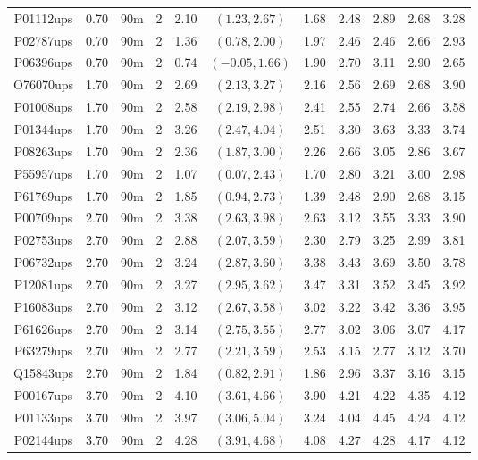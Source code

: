 \begin{landscape}
\begin{longtable}{cccc|cc|ccccc}
  P01112ups & 0.70 & 90m &   2 & 2.10 & $(1.23, 2.67)$ & 1.68 & 2.48 & 2.89 & 2.68 & 3.28 \\ 
  P02787ups & 0.70 & 90m &   2 & 1.36 & $(0.78, 2.00)$ & 1.97 & 2.46 & 2.46 & 2.66 & 2.93 \\ 
  P06396ups & 0.70 & 90m &   2 & 0.74 & $(-0.05, 1.66)$ & 1.90 & 2.70 & 3.11 & 2.90 & 2.65 \\ 
  O76070ups & 1.70 & 90m &   2 & 2.69 & $(2.13, 3.27)$ & 2.16 & 2.56 & 2.69 & 2.68 & 3.90 \\ 
  P01008ups & 1.70 & 90m &   2 & 2.58 & $(2.19, 2.98)$ & 2.41 & 2.55 & 2.74 & 2.66 & 3.58 \\ 
  P01344ups & 1.70 & 90m &   2 & 3.26 & $(2.47, 4.04)$ & 2.51 & 3.30 & 3.63 & 3.33 & 3.74 \\ 
  P08263ups & 1.70 & 90m &   2 & 2.36 & $(1.87, 3.00)$ & 2.26 & 2.66 & 3.05 & 2.86 & 3.67 \\ 
  P55957ups & 1.70 & 90m &   2 & 1.07 & $(0.07, 2.43)$ & 1.70 & 2.80 & 3.21 & 3.00 & 2.98 \\ 
  P61769ups & 1.70 & 90m &   2 & 1.85 & $(0.94, 2.73)$ & 1.39 & 2.48 & 2.90 & 2.68 & 3.15 \\ 
  P00709ups & 2.70 & 90m &   2 & 3.38 & $(2.63, 3.98)$ & 2.63 & 3.12 & 3.55 & 3.33 & 3.90 \\ 
  P02753ups & 2.70 & 90m &   2 & 2.88 & $(2.07, 3.59)$ & 2.30 & 2.79 & 3.25 & 2.99 & 3.81 \\ 
  P06732ups & 2.70 & 90m &   2 & 3.24 & $(2.87, 3.60)$ & 3.38 & 3.43 & 3.69 & 3.50 & 3.78 \\ 
  P12081ups & 2.70 & 90m &   2 & 3.27 & $(2.95, 3.62)$ & 3.47 & 3.31 & 3.52 & 3.45 & 3.92 \\ 
  P16083ups & 2.70 & 90m &   2 & 3.12 & $(2.67, 3.58)$ & 3.02 & 3.22 & 3.42 & 3.36 & 3.95 \\ 
  P61626ups & 2.70 & 90m &   2 & 3.14 & $(2.75, 3.55)$ & 2.77 & 3.02 & 3.06 & 3.07 & 4.17 \\ 
  P63279ups & 2.70 & 90m &   2 & 2.77 & $(2.21, 3.59)$ & 2.53 & 3.15 & 2.77 & 3.12 & 3.70 \\ 
  Q15843ups & 2.70 & 90m &   2 & 1.84 & $(0.82, 2.91)$ & 1.86 & 2.96 & 3.37 & 3.16 & 3.15 \\ 
  P00167ups & 3.70 & 90m &   2 & 4.10 & $(3.61, 4.66)$ & 3.90 & 4.21 & 4.22 & 4.35 & 4.12 \\ 
  P01133ups & 3.70 & 90m &   2 & 3.97 & $(3.06, 5.04)$ & 3.24 & 4.04 & 4.45 & 4.24 & 4.12 \\ 
  P02144ups & 3.70 & 90m &   2 & 4.28 & $(3.91, 4.68)$ & 4.08 & 4.27 & 4.28 & 4.17 & 4.12 \\ 

\end{longtable}
\end{landscape}
